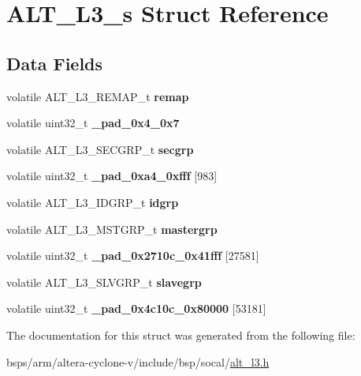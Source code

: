\hypertarget{structALT__L3__s}{}\section{A\+L\+T\+\_\+\+L3\+\_\+s Struct Reference}
\label{structALT__L3__s}
\subsection*{Data Fields}
\begin{DoxyCompactItemize}
\item 
\mbox{\label{structALT__L3__s_af925e0d797c50fb4190128f7b951dd2b}} 
volatile A\+L\+T\+\_\+\+L3\+\_\+\+R\+E\+M\+A\+P\+\_\+t {\bfseries remap}
\item 
\mbox{\label{structALT__L3__s_a5214719c1ec31bcf24af771744be4a3b}} 
volatile uint32\+\_\+t {\bfseries \+\_\+pad\+\_\+0x4\+\_\+0x7}
\item 
\mbox{\label{structALT__L3__s_a7ad35317284d2e0208fc7830a6198300}} 
volatile A\+L\+T\+\_\+\+L3\+\_\+\+S\+E\+C\+G\+R\+P\+\_\+t {\bfseries secgrp}
\item 
\mbox{\label{structALT__L3__s_af34e90442744a7377b11b6d2bda142a5}} 
volatile uint32\+\_\+t {\bfseries \+\_\+pad\+\_\+0xa4\+\_\+0xfff} \mbox{[}983\mbox{]}
\item 
\mbox{\label{structALT__L3__s_a795260b46cf8741c6746a2b5653754ae}} 
volatile A\+L\+T\+\_\+\+L3\+\_\+\+I\+D\+G\+R\+P\+\_\+t {\bfseries idgrp}
\item 
\mbox{\label{structALT__L3__s_a7fe050e6b0b78f18abfa25c222824456}} 
volatile A\+L\+T\+\_\+\+L3\+\_\+\+M\+S\+T\+G\+R\+P\+\_\+t {\bfseries mastergrp}
\item 
\mbox{\label{structALT__L3__s_a9247b3bb7f20cd78b7e29e58609f3de7}} 
volatile uint32\+\_\+t {\bfseries \+\_\+pad\+\_\+0x2710c\+\_\+0x41fff} \mbox{[}27581\mbox{]}
\item 
\mbox{\label{structALT__L3__s_a0b1286f3b438ea16f897c2814d1937bd}} 
volatile A\+L\+T\+\_\+\+L3\+\_\+\+S\+L\+V\+G\+R\+P\+\_\+t {\bfseries slavegrp}
\item 
\mbox{\label{structALT__L3__s_a703a26c9701a1cddb7565404c8bd8ea0}} 
volatile uint32\+\_\+t {\bfseries \+\_\+pad\+\_\+0x4c10c\+\_\+0x80000} \mbox{[}53181\mbox{]}
\end{DoxyCompactItemize}


The documentation for this struct was generated from the following file\+:\begin{DoxyCompactItemize}
\item 
bsps/arm/altera-\/cyclone-\/v/include/bsp/socal/\mbox{\hyperlink{alt__l3_8h}{alt\+\_\+l3.\+h}}\end{DoxyCompactItemize}
